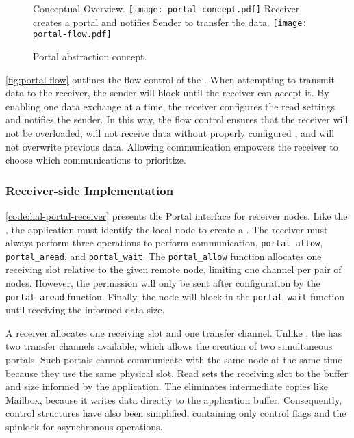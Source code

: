 			\begin{figure}[!h]
				\centering%
				\caption{Portal abstraction concept.}%
				\label{fig:portal}%

					{Conceptual Overview.}%
					{\texttt{[image: portal-concept.pdf]}}%
				\hspace{1cm}%
					{Receiver creates a portal and notifies Sender to transfer the data.}%
					{\texttt{[image: portal-flow.pdf]}}%

			\end{figure}

			\autoref{fig:portal-flow} outlines the flow control of the \portal.
			When attempting to transmit data to the receiver, the sender will block
			until the receiver can accept it. By enabling one data exchange at a time,
			the receiver configures the read settings and notifies the sender. In this way,
			the flow control ensures that the receiver will not be overloaded, will
			not receive data without properly configured \dma, and will not overwrite
			previous data. Allowing communication empowers the receiver to choose which
			communications to prioritize.

			\subsubsection{Receiver-side Implementation}

				\autoref{code:hal-portal-receiver} presents the Portal interface for
				receiver nodes. Like the \mailbox, the application must identify the
				local node to create a \portal. The receiver must always perform
				three operations to perform communication, \ie \texttt{portal\_allow},
				\texttt{portal\_aread}, and \texttt{portal\_wait}. The \texttt{portal\_allow} function allocates one
				receiving slot relative to the given remote node, limiting one
				channel per pair of nodes. However, the permission will only be
				sent after \dma configuration by the \texttt{portal\_aread} function. Finally, the
				node will block in the \texttt{portal\_wait} function until receiving the informed
				data size.

				A receiver allocates one \dnoc receiving slot and one \cnoc transfer
				channel. Unlike \mailbox, the \portal has two transfer channels
				available, which allows the creation of two simultaneous portals.
				Such portals cannot communicate with the same node at the same time
				because they use the same physical slot. Read sets the
				receiving slot to the buffer and size informed by the application.
				The \dma eliminates intermediate copies like Mailbox, because it
				writes data directly to the application buffer. Consequently,
				control structures have also been simplified, containing only
				control flags and the spinlock for asynchronous operations.

